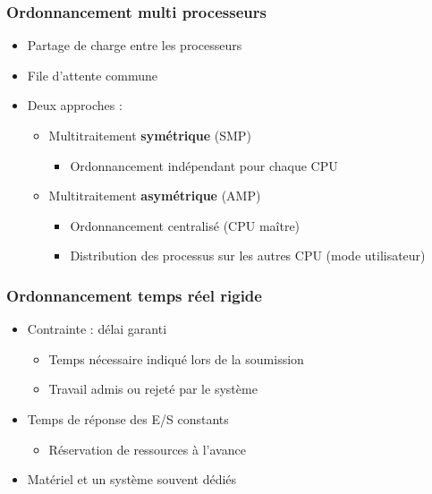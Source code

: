 \begin{frame}
 \frametitle{Ordonnancement multi processeurs}
 \begin{itemize}
  \item Partage de charge entre les processeurs
  \item File d’attente commune
  \item Deux approches :
  \begin{itemize}
   \item Multitraitement \textbf{symétrique} (SMP)
   \begin{itemize}
    \item Ordonnancement indépendant pour chaque CPU
   \end{itemize}
   \item Multitraitement \textbf{asymétrique} (AMP)
   \begin{itemize}
    \item Ordonnancement centralisé (CPU maître)
    \item Distribution des processus sur les autres CPU (mode utilisateur)
   \end{itemize}
  \end{itemize}
 \end{itemize}
\end{frame}


\begin{frame}
 \frametitle{Ordonnancement temps réel rigide}
 \begin{itemize}
 \item Contrainte : délai garanti
 \begin{itemize}
 \item Temps nécessaire indiqué lors de la soumission
 \item Travail admis ou rejeté par le système
 \end{itemize}
 \item Temps de réponse des E/S constants
 \begin{itemize}
 \item Réservation de ressources à l'avance
 \end{itemize}
 \item Matériel et un système souvent dédiés
 \end{itemize}
\end{frame}

